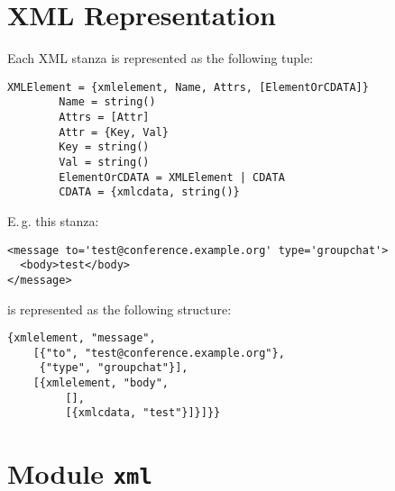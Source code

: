 \documentclass[a4paper,10pt]{article}
\begin{document}
\section{XML Representation}
\label{xmlrepr}

Each XML stanza is represented as the following tuple:
\begin{verbatim}
XMLElement = {xmlelement, Name, Attrs, [ElementOrCDATA]}
        Name = string()
        Attrs = [Attr]
        Attr = {Key, Val}
        Key = string()
        Val = string()
        ElementOrCDATA = XMLElement | CDATA
        CDATA = {xmlcdata, string()}
\end{verbatim}
E.\,g. this stanza:
\begin{verbatim}
<message to='test@conference.example.org' type='groupchat'>
  <body>test</body>
</message>
\end{verbatim}
is represented as the following structure:
\begin{verbatim}
{xmlelement, "message",
    [{"to", "test@conference.example.org"},
     {"type", "groupchat"}],
    [{xmlelement, "body",
         [],
         [{xmlcdata, "test"}]}]}}
\end{verbatim}



\section{Module \texttt{xml}}
\label{xmlmod}
\end{document}
